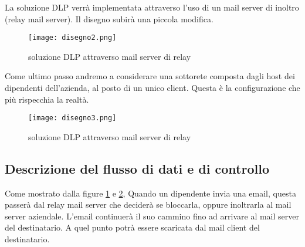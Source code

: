 \pagebreak
La soluzione DLP verrà implementata attraverso l'uso di un mail server di inoltro (relay mail server).
Il disegno subirà una piccola modifica.

\begin{figure}[htp]
  \centering
  \texttt{[image: disegno2.png]}
  \caption{soluzione DLP attraverso mail server di relay}\label{disegno2}
\end{figure}

Come ultimo passo andremo a considerare una sottorete composta dagli host dei dipendenti dell'azienda, al
posto di un unico client. Questa è la configurazione che più rispecchia la realtà.

\begin{figure}[htp]
  \centering
  \texttt{[image: disegno3.png]}
  \caption{soluzione DLP attraverso mail server di relay}\label{disegno3}
\end{figure}

\subsection{Descrizione del flusso di dati e di controllo}
Come mostrato dalla figure \ref{disegno2} e \ref{disegno3}, Quando un dipendente invia una email, questa
passerà dal relay mail server che deciderà se bloccarla, oppure inoltrarla al mail server aziendale. L'email
continuerà il suo cammino fino ad arrivare al mail server del destinatario. A quel punto potrà essere scaricata
dal mail client del destinatario.